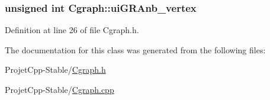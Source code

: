 \subsubsection[{ui\+G\+R\+Anb\+\_\+vertex}]{\setlength{\rightskip}{0pt plus 5cm}unsigned int Cgraph\+::ui\+G\+R\+Anb\+\_\+vertex\hspace{0.3cm}{\ttfamily [private]}}\label{class_cgraph_af86fdbce68779def5a1803c609567860}


Definition at line 26 of file Cgraph.\+h.



The documentation for this class was generated from the following files\+:\begin{DoxyCompactItemize}
\item 
Projet\+Cpp-\/\+Stable/\hyperlink{_cgraph_8h}{Cgraph.\+h}\item 
Projet\+Cpp-\/\+Stable/\hyperlink{_cgraph_8cpp}{Cgraph.\+cpp}\end{DoxyCompactItemize}
